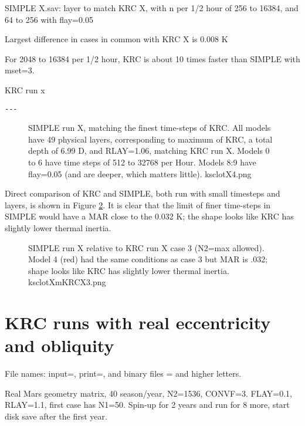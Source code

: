 \documentclass{article}
\begin{document}
SIMPLE  X.sav: layer to match KRC X, with n per 1/2 hour of  256 to 16384,
and 64 to 256 with flay=0.05

Largest difference in cases in common with KRC X is 0.008 K 

For 2048 to 16384 per 1/2 hour, KRC is about 10 times faster than SIMPLE
with mset=3.

\begin{table} \caption[Long runs]{KRC run x} \label{runX}
\begin{verbatim}
---
\end{verbatim}
\vspace{-3.0mm}
\hrulefill \end{table} 

\begin{figure}[!ht] 
\caption[SIMPLE with small timesteps]{SIMPLE run X, matching the finest
  time-steps of KRC. All models have 49 physical layers, corresponding to
  maximum of KRC, a total depth of 6.99 D, and RLAY=1.06, matching KRC run
  X. Models 0 to 6 have time steps of 512 to 32768 per Hour. Models 8:9 have
  flay=0.05 (and are deeper, which matters little).
\label{ksclotX4} ksclotX4.png }
\end{figure} 

Direct comparison of KRC and SIMPLE, both run with small timesteps and layers,
is shown in Figure \ref{ksclotXmKRCX3}. It is clear that the limit of finer
time-steps in SIMPLE would have a MAR close to the 0.032 K; the shape looks like
KRC has slightly lower thermal inertia.



\begin{figure}[!ht] 
\caption[SIMPLE-KRC]{SIMPLE run X relative to KRC run X case 3 (N2=max
  allowed). Model 4 (red) had the same conditions as case 3 but MAR is .032; shape
  looks like KRC has slightly lower thermal inertia.
\label{ksclotXmKRCX3} ksclotXmKRCX3.png }
\end{figure} 
\clearpage


\section{KRC runs with real eccentricity and obliquity}
File names: input=, print=, and binary files = and higher letters.

Real Mars geometry matrix, 40 season/year, N2=1536, CONVF=3. FLAY=0.1, RLAY=1.1,
 first case has N1=50. Spin-up for 2 years and run for 8 more, start disk save after the first year.  
\end{document}
